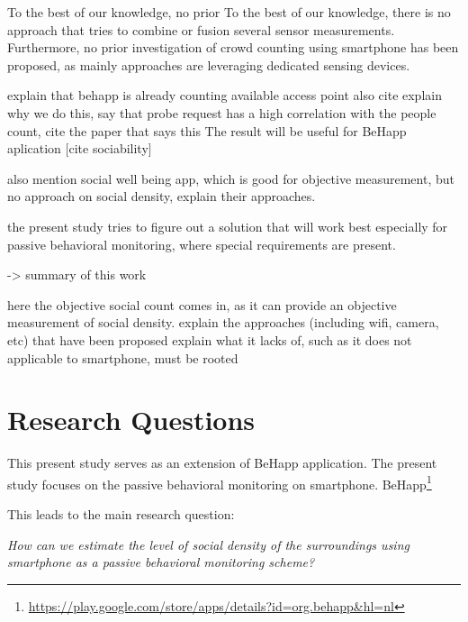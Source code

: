 To the best of our knowledge, no prior \cite{thesis001}
To the best of our knowledge, there is no approach that tries to combine or fusion several sensor measurements. Furthermore, no prior investigation of crowd counting using smartphone has been proposed, as mainly approaches are leveraging dedicated sensing devices.

explain that behapp is already counting available access point also cite
explain why we do this, say that probe request has a high correlation with the people count, cite the paper that says this
The result will be useful for BeHapp aplication [cite sociability]


also mention social well being app, which is good for objective measurement, but no approach on social density, explain their approaches.

the present study tries to figure out a solution that will work best especially for passive behavioral monitoring, where special requirements are present.

-> summary of this work

here the objective social count comes in, as it can provide an objective
measurement of social density. explain the approaches (including wifi, camera, etc) that have been proposed
explain what it lacks of, such as it does not applicable to smartphone, must be rooted

\section{Research Questions} %
\label{sec:research_questions}
This present study serves as an extension of BeHapp application. The present study focuses on the passive behavioral monitoring on smartphone.
BeHapp\footnote{\url{https://play.google.com/store/apps/details?id=org.behapp&hl=nl}}

This leads to the main research question:
\begin{displayquote}\textit{
How can we estimate the level of social density of the surroundings using smartphone as a passive behavioral monitoring scheme?}
\end{displayquote}

